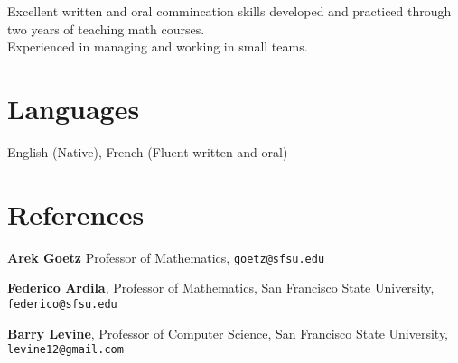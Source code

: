 \documentclass[margin,line,pifont,palatino,courier]{res}
\begin{document}
\begin{resume}
Excellent written and oral commincation skills developed and practiced through two years of teaching math courses.  \\
Experienced in managing and working in small teams. 



\section{\sc  Languages}
  English (Native), French (Fluent written and oral)


\section{\sc   References}

{\bf Arek Goetz} Professor of Mathematics, 
  \texttt{goetz@sfsu.edu} 

{\bf Federico Ardila}, Professor of Mathematics, San Francisco State University, \\
\texttt{federico@sfsu.edu}

  {\bf Barry Levine}, Professor of Computer Science,  San Francisco State University, \\
\texttt{levine12@gmail.com}

\end{resume}
\end{document}
